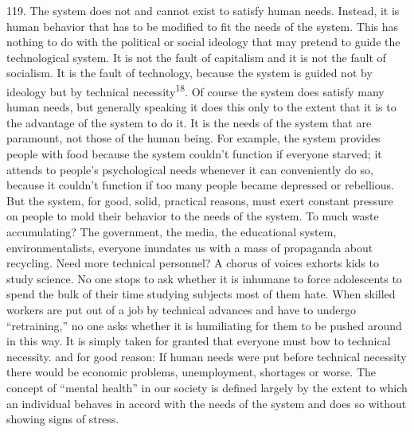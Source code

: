 \documentclass{article}
\begin{document}
119.  The system does not and cannot exist to satisfy human needs.  Instead, it is human behavior 
that has to be modified to fit the needs of the system.  This has nothing to do with the political or 
social ideology that may pretend to guide the technological system.  It is not the fault of capitalism 
and it is not the fault of socialism.  It is the fault of technology, because the system is guided not 
by ideology but by technical necessity\textsuperscript{18}.  Of course the system does satisfy many human needs, 
but generally speaking it does this only to the extent that it is to the advantage of the system to do 
it.  It is the needs of the system that are paramount, not those of the human being.  For example, 
the system provides people with food because the system couldn’t function if everyone starved; it 
attends to people’s psychological needs whenever it can conveniently do so, because it couldn’t 
function  if  too  many  people  became  depressed  or  rebellious.   But  the  system,  for  good,  solid,  
practical reasons, must exert constant pressure on people to mold their behavior to the needs of the 
system.   To  much  waste  accumulating?  The  government,  the  media,  the  educational  system,  
environmentalists, everyone inundates us with a mass of propaganda about recycling.  Need more 
technical personnel? A chorus of voices exhorts kids to study science.  No one stops to ask whether 
it is inhumane to force adolescents to spend the bulk of their time studying subjects most of them 
hate.   When  skilled  workers  are  put  out  of  a  job  by  technical  advances  and  have  to  undergo  
“retraining,” no one asks whether it is humiliating for them to be pushed around in this way.  It is 
simply taken for granted that everyone must bow to technical necessity.  and for good reason: If 
human needs were put before technical necessity there would be economic problems, 
unemployment,  shortages  or  worse.   The  concept  of  “mental  health”  in  our  society  is  defined  
largely by the extent to which an individual behaves in accord with the needs of the system and 
does so without showing signs of stress. \vspace{\baselineskip}
\end{document}
